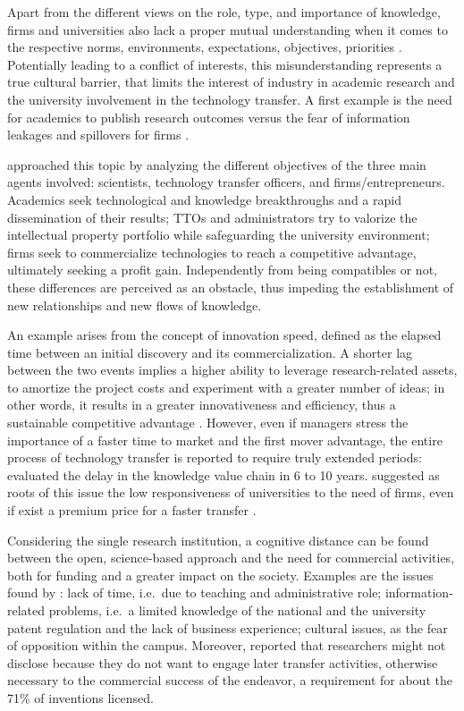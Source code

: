 Apart from the different views on the role, type, and importance of knowledge, firms and universities also lack a proper mutual understanding when it comes to the respective norms, environments, expectations, objectives, priorities \citep{Siegel2003a, Link2005, Muscio2010}. Potentially leading to a conflict of interests, this misunderstanding represents a true cultural barrier, that limits the interest of industry in academic research and the university involvement in the technology transfer. A first example is the need for academics to publish research outcomes versus the fear of information leakages and spillovers for firms \citep{Gilsing2011}.

\citet{Siegel2007} approached this topic by analyzing the different objectives of the three main agents involved: scientists, technology transfer officers, and firms/entrepreneurs. Academics seek technological and knowledge breakthroughs and a rapid dissemination of their results; TTOs and administrators try to valorize the intellectual property portfolio while safeguarding the university environment; firms seek to commercialize technologies to reach a competitive advantage, ultimately seeking a profit gain. Independently from being compatibles or not, these differences are perceived as an obstacle, thus impeding the establishment of new relationships and new flows of knowledge.

An example arises from the concept of innovation speed, defined as the elapsed time between an initial discovery and its commercialization. A shorter lag between the two events implies a higher ability to leverage research-related assets, to amortize the project costs and experiment with a greater number of ideas; in other words, it results in a greater innovativeness and efficiency, thus a sustainable competitive advantage \citep{Markman2005}. However, even if managers stress the importance of a faster time to market and the first mover advantage, the entire process of technology transfer is reported to require truly extended periods: \citet{Heher2006} evaluated the delay in the knowledge value chain in 6 to 10 years. \citet{Link2005} suggested as roots of this issue the low responsiveness of universities to the need of firms, even if exist a premium price for a faster transfer \citep{Markman2005}.

Considering the single research institution, a cognitive distance can be found between the open, science-based approach and the need for commercial activities, both for funding and a greater impact on the society. Examples are the issues found by \citet{Baldini2007}: lack of time, i.e.\ due to teaching and administrative role; information-related problems, i.e.\ a limited knowledge of the national and the university patent regulation and the lack of business experience; cultural issues, as the fear of opposition within the campus. Moreover, \citet{Jensen2003} reported that researchers might not disclose because they do not want to engage later transfer activities, otherwise necessary to the commercial success of the endeavor, a requirement for about the 71\% of inventions licensed.

